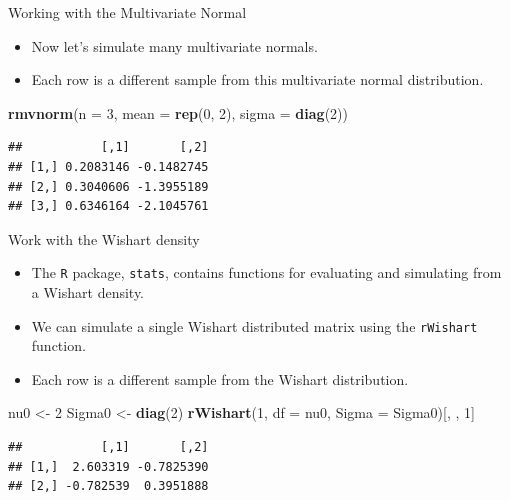 \documentclass[
  ignorenonframetext,
]{beamer}
\newenvironment{Shaded}{\begin{snugshade}}{\end{snugshade}}
\newcommand{\DataTypeTok}[1]{\textcolor[rgb]{0.13,0.29,0.53}{#1}}
\newcommand{\DecValTok}[1]{\textcolor[rgb]{0.00,0.00,0.81}{#1}}
\newcommand{\KeywordTok}[1]{\textcolor[rgb]{0.13,0.29,0.53}{\textbf{#1}}}
\newcommand{\NormalTok}[1]{#1}
\newcommand{\StringTok}[1]{\textcolor[rgb]{0.31,0.60,0.02}{#1}}
\providecommand{\tightlist}{%
  \setlength{\itemsep}{0pt}\setlength{\parskip}{0pt}}
\begin{document}
\begin{frame}[fragile]{Working with the Multivariate Normal}
\protect\hypertarget{working-with-the-multivariate-normal}{}

\begin{itemize}
\tightlist
\item
  Now let's simulate many multivariate normals.
\item
  Each row is a different sample from this multivariate normal
  distribution.
\end{itemize}

\begin{Shaded}
\begin{Highlighting}[]
\KeywordTok{rmvnorm}\NormalTok{(}\DataTypeTok{n =} \DecValTok{3}\NormalTok{, }\DataTypeTok{mean =} \KeywordTok{rep}\NormalTok{(}\DecValTok{0}\NormalTok{, }\DecValTok{2}\NormalTok{), }\DataTypeTok{sigma =} \KeywordTok{diag}\NormalTok{(}\DecValTok{2}\NormalTok{))}
\end{Highlighting}
\end{Shaded}

\begin{verbatim}
##           [,1]       [,2]
## [1,] 0.2083146 -0.1482745
## [2,] 0.3040606 -1.3955189
## [3,] 0.6346164 -2.1045761
\end{verbatim}

\end{frame}

\begin{frame}[fragile]{Work with the Wishart density}
\protect\hypertarget{work-with-the-wishart-density}{}

\begin{itemize}
\item
  The \texttt{R} package, \texttt{stats}, contains functions for
  evaluating and simulating from a Wishart density.
\item
  We can simulate a single Wishart distributed matrix using the
  \texttt{rWishart} function.
\item
  Each row is a different sample from the Wishart distribution.
\end{itemize}

\begin{Shaded}
\begin{Highlighting}[]
\NormalTok{nu0 <-}\StringTok{ }\DecValTok{2}
\NormalTok{Sigma0 <-}\StringTok{ }\KeywordTok{diag}\NormalTok{(}\DecValTok{2}\NormalTok{)}
\KeywordTok{rWishart}\NormalTok{(}\DecValTok{1}\NormalTok{, }\DataTypeTok{df =}\NormalTok{ nu0, }\DataTypeTok{Sigma =}\NormalTok{ Sigma0)[, , }\DecValTok{1}\NormalTok{]}
\end{Highlighting}
\end{Shaded}

\begin{verbatim}
##           [,1]       [,2]
## [1,]  2.603319 -0.7825390
## [2,] -0.782539  0.3951888
\end{verbatim}

\end{frame}
\end{document}
